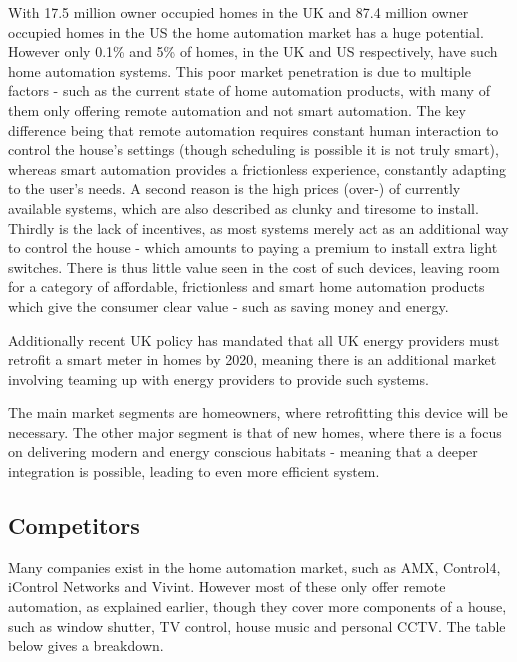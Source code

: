 \documentclass[10.5pt,a4paper,twoside]{report}   %
\begin{document}
With 17.5 million owner occupied homes in the UK and 87.4 million owner occupied homes in the US the home automation market has a huge potential. However only 0.1\% and 5\% of homes, in the UK and US respectively, have such home automation systems. This poor market penetration is due to multiple factors - such as the current state of home automation products, with many of them only offering remote automation and not smart automation. The key difference being that remote automation requires constant human interaction to control the house's settings (though scheduling is possible it is not truly smart), whereas smart automation provides a frictionless experience, constantly adapting to the user's needs. A second reason is the high prices (over-) of currently available systems\cite{houzzelgan}, which are also described as clunky and tiresome to install. Thirdly is the lack of incentives, as most systems merely act as an additional way to control the house - which amounts to paying a premium to install extra light switches. There is thus little value seen in the cost of such devices, leaving room for a category of affordable, frictionless and smart home automation products which give the consumer clear value - such as saving money and energy.

Additionally recent UK policy has mandated that all UK energy providers must retrofit a smart meter in homes by 2020\cite{hmgovenergy}, meaning there is an additional market involving teaming up with energy providers to provide such systems.

The main market segments are homeowners, where retrofitting this device will be necessary. The other major segment is that of new homes, where there is a focus on delivering modern and energy conscious habitats - meaning that a deeper integration is possible, leading to even more efficient system.
\subsection{Competitors}

Many companies exist in the home automation market, such as AMX, Control4, iControl Networks and Vivint. However most of these only offer remote automation, as explained earlier, though they cover more components of a house, such as window shutter, TV control, house music and personal CCTV.  The table below gives a breakdown.
\end{document}
